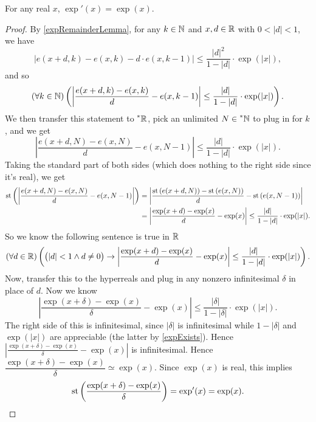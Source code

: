 \begin{thm}
    For any real $x$, $\exp'(x) = \exp(x)$.
\end{thm}

\begin{proof}
    By \autoref{expRemainderLemma}, for any $k \in \mathbb{N}$ and $x, d \in \mathbb{R}$ with $0 < |d| < 1$, we have
    \[ 
    \left|e(x + d, k) - e(x, k) - d\cdot e(x, k-1)\right| \leq \frac{|d|^2}{1 - |d|} \cdot \exp(|x|), 
    \]
    and so
    \[
    (\forall k \in \mathbb{N})\left(\left|\frac{e(x + d, k) - e(x, k)}{d} - e(x, k - 1)\right| \leq \frac{|d|}{1 - |d|} \cdot \exp(|x|)\right).
    \]
    We then transfer this statement to $\prescript{*}{}{\mathbb{R}}$, pick an unlimited $N \in \prescript{*}{}{\mathbb{N}}$ to plug in for $k$, and we get
    \[
    \left|\frac{e(x + d, N) - e(x, N)}{d} - e(x, N - 1)\right| \leq \frac{|d|}{1-|d|} \cdot \exp(|x|).
    \]
    Taking the standard part of both sides (which does nothing to the right side since it's real), we get
    \begin{align*}
    \operatorname{st}\left(\left|\frac{e(x + d, N) - e(x, N)}{d} - e(x, N - 1)\right|\right) &= \left|\frac{\operatorname{st}\left(e(x + d, N)\right) - \operatorname{st}\left(e(x, N)\right)}{d} - \operatorname{st}\left(e(x, N - 1)\right)\right| \\
        &= \left|\frac{\exp(x + d) - \exp(x)}{d} - \exp(x)\right| \leq \frac{|d|}{1-|d|} \cdot \exp(|x|).
    \end{align*}
    So we know the following sentence is true in $\mathbb{R}$
    \[
    (\forall d \in \mathbb{R})\left(\big(|d| < 1 \land d \neq 0\big) \to \left|\frac{\exp(x + d) - \exp(x)}{d} - \exp(x)\right| \leq \frac{|d|}{1-|d|} \cdot \exp(|x|)\right).
    \]
    Now, transfer this to the hyperreals and plug in any nonzero infinitesimal $\delta$ in place of $d$. Now we know
    \[
    \left|\frac{\exp(x + \delta) - \exp(x)}{\delta} - \exp(x)\right| \leq \frac{|\delta|}{1-|\delta|} \cdot \exp(|x|).
    \]
    The right side of this is infinitesimal, since $|\delta|$ is infinitesimal while $1 - |\delta|$ and $\exp(|x|)$ are appreciable (the latter by \autoref{expExists}). Hence $\left|\frac{\exp(x + \delta) - \exp(x)}{\delta} - \exp(x)\right|$ is infinitesimal. Hence $\dfrac{\exp(x + \delta) - \exp(x)}{\delta} \simeq \exp(x)$. Since $\exp(x)$ is real, this implies
    \[
    \operatorname{st}\left(\frac{\exp(x + \delta) - \exp(x)}{\delta}\right) = \exp'(x) = \exp(x).
    \]
\end{proof}